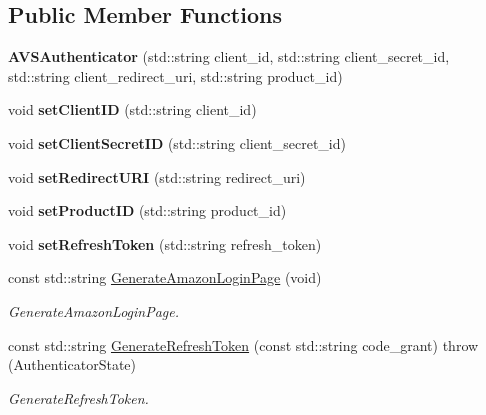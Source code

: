 \subsection*{Public Member Functions}
\begin{DoxyCompactItemize}
\item 
\mbox{\label{classAVSAuthenticator_a1f79451e5fa0c1390097e4ff73b5b40b}} 
{\bfseries A\+V\+S\+Authenticator} (std\+::string client\+\_\+id, std\+::string client\+\_\+secret\+\_\+id, std\+::string client\+\_\+redirect\+\_\+uri, std\+::string product\+\_\+id)
\item 
\mbox{\label{classAVSAuthenticator_ad7f0bc8ce2105bf1b6449e6ff86d5cbf}} 
void {\bfseries set\+Client\+ID} (std\+::string client\+\_\+id)
\item 
\mbox{\label{classAVSAuthenticator_a198c681ea8cc27f07556d4b756e4e38c}} 
void {\bfseries set\+Client\+Secret\+ID} (std\+::string client\+\_\+secret\+\_\+id)
\item 
\mbox{\label{classAVSAuthenticator_abcd468107452a7ad4b9c5dcfcf6b350e}} 
void {\bfseries set\+Redirect\+U\+RI} (std\+::string redirect\+\_\+uri)
\item 
\mbox{\label{classAVSAuthenticator_ab0f9175b2937a08ca40484618a808bda}} 
void {\bfseries set\+Product\+ID} (std\+::string product\+\_\+id)
\item 
\mbox{\label{classAVSAuthenticator_aa0e753cc2972da2dd5d6a7b010386549}} 
void {\bfseries set\+Refresh\+Token} (std\+::string refresh\+\_\+token)
\item 
const std\+::string \hyperlink{classAVSAuthenticator_ad7c95c1a81852aff4c9bedb96da49ee8}{Generate\+Amazon\+Login\+Page} (void)
\begin{DoxyCompactList}\small\item\em Generate\+Amazon\+Login\+Page. \end{DoxyCompactList}\item 
const std\+::string \hyperlink{classAVSAuthenticator_ab08c84db0227d93f3a23713bd9970c95}{Generate\+Refresh\+Token} (const std\+::string code\+\_\+grant)  throw (\+Authenticator\+State)
\begin{DoxyCompactList}\small\item\em Generate\+Refresh\+Token. \end{DoxyCompactList}\item 

\end{DoxyCompactItemize}
